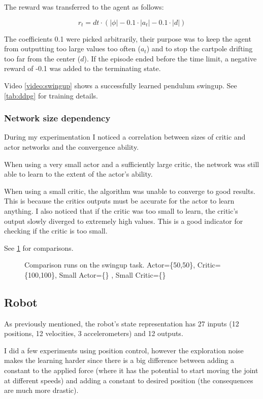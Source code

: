 The reward was transferred to the agent as follows:

$$r_t = dt \cdot (|\phi| - 0.1\cdot |a_t| - 0.1\cdot |d|)$$

The coefficients 0.1 were picked arbitrarily, their purpose was to keep the agent from outputting too large values too often ($a_t$) and to stop the cartpole drifting too far from the center ($d$). If the episode ended before the time limit, a negative reward of -0.1 was added to the terminating state.

Video \ref{video:swingup} shows a successfully learned pendulum swingup. See \ref{tab:ddpg} for training details.

\subsubsection{Network size dependency}
During my experimentation I noticed a correlation between sizes of critic and actor networks and the convergence ability. 

When using a very small actor and a sufficiently large critic, the network was still able to learn to the extent of the actor's ability.

When using a small critic, the algorithm was unable to converge to good results. This is because the critics outputs must be accurate for the actor to learn anything. I also noticed that if the critic was too small to learn, the critic's output slowly diverged to extremely high values. This is a good indicator for checking if the critic is too small.

See \ref{plot:act-off} for comparisons.

\begin{figure}[htbp]

\caption{Comparison runs on the swingup task. Actor=\{50,50\}, Critic=\{100,100\}, Small Actor=\{\}
, Small Critic=\{\}}
\centering
\label{plot:act-off}
\end{figure}

\subsection{Robot}

As previously mentioned, the robot's state representation has 27 inputs (12 positions, 12 velocities, 3 accelerometers) and 12 outputs. 

I did a few experiments using position control, however the exploration noise makes the learning harder since there is a big difference between adding a constant to the applied force (where it has the potential to start moving the joint at different speeds) and adding a constant to desired position (the consequences are much more drastic).

